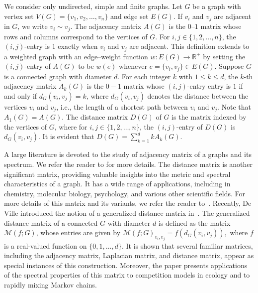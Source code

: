 \documentclass[12pt]{article}
\numberwithin{equation}{section}
\begin{document}
We consider only undirected, simple and finite
graphs.  Let $G$ be a  graph  with vertex set $V(G)=\{v_1, v_2, \ldots, v_n\}$ and edge set $E(G)$. If $v_i$ and $v_j$ are adjacent in $G$, we write $v_i\sim v_j$. The adjacency matrix $A(G)$ is the $0$–$1$ matrix whose rows and columns correspond to the vertices of $G$. For $i,j\in\{1,2,
\ldots,n\}$, the $(i,j)$-entry  is $1$ exactly when $v_i$ and $v_j$ are adjacent. This definition extends to a weighted graph with an edge–weight function $w: E(G)\to\mathbb{R}^+$ by setting the $(i,j)$-entry of $A(G)$ to be $w(e)$ whenever $e=\{v_i, v_j\}\in E(G)$. 	Suppose $G$ is a connected graph with diameter $d$. For each integer $k$ with $1 \leq k \leq d$, the $k$-th adjacency matrix $A_k(G)$ is the $0-1$ matrix whose $(i,j)$-entry entry is $1$ if and only if $d_G(v_i,v_j)=k$, where $d_G(v_i,v_j)$ denotes the distance between the vertices $v_i$
and $v_j$, i.e., the length of a shortest path between $v_i$ and $v_j$. Note that $A_1(G)=A(G)$. The distance matrix $D(G)$ of $G$ is the  matrix  indexed by the vertices of $G$, where for $i,j \in \{1,2,\ldots,n\}$, the $(i,j)$-entry of $D(G)$ is $d_{G}(v_i,v_j)$. It is evident that $D(G)=\sum_{k=1}^dkA_k(G)$.


A large literature is devoted to the study of adjacency matrix of a graphs and its spectrum. We refer the reader to \cite{bapat2010graphs,cvetkovic2010introduction} for more details. The distance matrix is another significant matrix, providing valuable insights into the metric and spectral characteristics of a graph. It has a wide range of applications, including in chemistry, molecular biology, psychology, and various other scientific fields. For more details of this matrix and its variants, we refer the reader to~\cite{aouchiche2014survey,aouchiche2013twolaplacians,hogben2022spectra,stevanovic2012spectral}.	
Recently,	De Ville introduced the notion of a generalized distance matrix in~\cite{deville2022thegeneralized}. 
	The generalized distance matrix of a connected $G$ with diameter $d$ is defined as the matrix $\mathcal{M}(f; G)$, whose entries are given by $
	\mathcal{M}(f; G)_{v_i,v_j} = f(d_{G}(v_i,v_j)),
$ where $f$ is a real-valued function on $\{0,1,\ldots, d\}$. It is shown that several familiar matrices, including the adjacency matrix, Laplacian matrix, and distance matrix, appear as special instances of this construction. Moreover, the paper presents applications of the spectral properties of this matrix to competition models in ecology and to rapidly mixing Markov chains.
	
\end{document}
